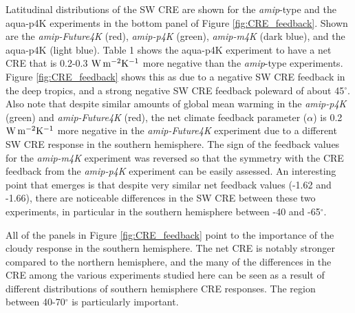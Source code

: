 \documentclass[draft]{agujournal2019}
\begin{document}
Latitudinal distributions of the SW CRE are shown for the \textit{amip}-type and the aqua-p4K experiments in the bottom 
panel of Figure \ref{fig:CRE_feedback}.  Shown are the \textit{amip-Future4K} (red), \textit{amip-p4K} (green), 
\textit{amip-m4K} (dark blue), and the aqua-p4K (light blue).   Table 1 shows the aqua-p4K experiment to have a net CRE 
that is 0.2-0.3  $\rm{W\, m^{-2} K^{-1}}$ more negative than the \textit{amip}-type experiments.  Figure 
\ref{fig:CRE_feedback} shows this as due to a negative SW CRE feedback in the deep tropics, and a strong negative 
SW CRE feedback poleward of about 45$^{\circ}$.  
Also note that despite similar amounts of global mean warming in the \textit{amip-p4K} (green) and 
\textit{amip-Future4K} (red), the net climate feedback parameter ($\alpha$) is 0.2 $\rm{W\, m^{-2} K^{-1}}$ more negative
in the \textit{amip-Future4K} experiment due to a different SW CRE response in the southern hemisphere.  
The sign of the feedback values for the \textit{amip-m4K} experiment was reversed so that the symmetry with the CRE
feedback from the \textit{amip-p4K} experiment can be easily assessed.  An interesting point that emerges is that 
despite very similar net feedback values (-1.62 and -1.66), there are noticeable differences in the SW CRE between 
these two experiments, in particular in the southern hemisphere between -40 and -65$^{\circ}$.

All of the panels in Figure \ref{fig:CRE_feedback} point to the importance of the cloudy response in the southern 
hemisphere.   The net CRE is notably stronger compared to the northern hemisphere, and the many of the differences 
in the CRE among the various experiments studied here can be seen as a result of different distributions of southern 
hemisphere CRE responses.  The region between 40-70$^{\circ}$ is particularly important.  

\end{document}
